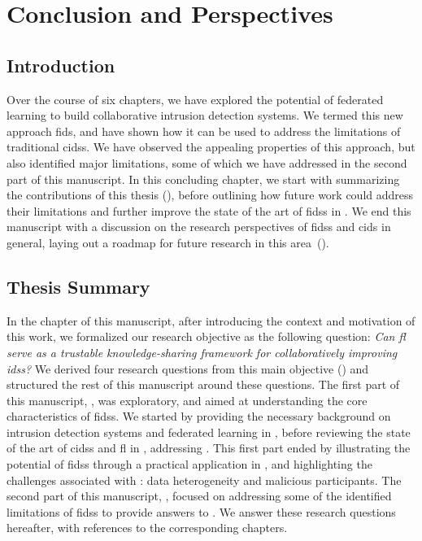 \chapter{Conclusion and Perspectives\label{chap:conclusion}}

\section{Introduction\label{sec:conclusion.introduction}}

Over the course of six chapters, we have explored the potential of federated learning to build collaborative intrusion detection systems.
We termed this new approach \gls{fids}, and have shown how it can be used to address the limitations of traditional \glspl{cids}.
We have observed the appealing properties of this approach, but also identified major limitations, some of which we have addressed in the second part of this manuscript.
In this concluding chapter, we start with summarizing the contributions of this thesis (), before outlining how future work could address their limitations and further improve the state of the art of \glspl{fids} in .
We end this manuscript with a discussion on the research perspectives of \glspl{fids} and \gls{cids} in general, laying out a roadmap for future research in this area~().


\section{Thesis Summary\label{sec:conclusion.contribs}}

In the  chapter of this manuscript, after introducing the context and motivation of this work, we formalized our research objective as the following question: \emph{Can \gls{fl} serve as a trustable knowledge-sharing framework for collaboratively improving \glspl{ids}?}
We derived four research questions from this main objective () and structured the rest of this manuscript around these questions.
The first part of this manuscript, , was exploratory, and aimed at understanding the core characteristics of \glspl{fids}.
We started by providing the necessary background on intrusion detection systems and federated learning in , before reviewing the state of the art of \glspl{cids} and \gls{fl} in , addressing .
This first part ended by illustrating the potential of \glspl{fids} through a practical application in , and highlighting the challenges associated with : data heterogeneity and malicious participants.
The second part of this manuscript, , focused on addressing some of the identified limitations of \glspl{fids} to provide answers to .
We answer these research questions hereafter, with references to the corresponding chapters.

